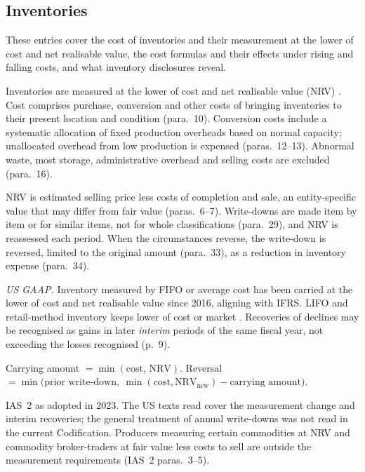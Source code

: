 \subsection{Inventories}

These entries cover the cost of inventories and their measurement at the lower of cost and net realisable value, the cost formulas and their effects under rising and falling costs, and what inventory disclosures reveal.

\begin{qfmethod}\label{meth:inventory-measurement-nrv}
 Inventories are measured at the lower of cost and net realisable value (NRV) \citep[IAS~2 para.~9]{eu-2023-1803-ias2}. Cost comprises purchase, conversion and other costs of bringing inventories to their present location and condition (para.~10). Conversion costs include a systematic allocation of fixed production overheads based on normal capacity; unallocated overhead from low production is expensed (paras.~12--13). Abnormal waste, most storage, administrative overhead and selling costs are excluded (para.~16).

NRV is estimated selling price less costs of completion and sale, an entity-specific value that may differ from fair value (paras.~6--7). Write-downs are made item by item or for similar items, not for whole classifications (para.~29), and NRV is reassessed each period. When the circumstances reverse, the write-down is reversed, limited to the original amount (para.~33), as a reduction in inventory expense (para.~34).

\emph{US GAAP.} Inventory measured by FIFO or average cost has been carried at the lower of cost and net realisable value since 2016, aligning with IFRS. LIFO and retail-method inventory keeps lower of cost or market \citep[pp.~1--2]{us-inventory-2015}. Recoveries of declines may be recognised as gains in later \emph{interim} periods of the same fiscal year, not exceeding the losses recognised (p.~9).

 Carrying amount $=\min(\text{cost},\,\mathrm{NRV})$. Reversal $=\min\bigl(\text{prior write-down},\ \min(\text{cost},\mathrm{NRV}_{\text{new}})-\text{carrying amount}\bigr)$.

 IAS~2 as adopted in 2023. The US texts read cover the measurement change and interim recoveries; the general treatment of annual write-downs was not read in the current Codification. Producers measuring certain commodities at NRV and commodity broker-traders at fair value less costs to sell are outside the measurement requirements (IAS~2 paras.~3--5).


\end{qfmethod}
